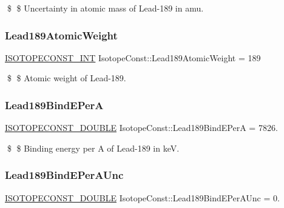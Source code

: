 \$ \$ Uncertainty in atomic mass of Lead-\/189 in amu. \mbox{\label{group___isotope_const-_lead-_pb189_gaf3a9e4e658891198340e231dde4169ab}} 
\subsubsection{\texorpdfstring{Lead189\+Atomic\+Weight}{Lead189AtomicWeight}}
{\footnotesize\ttfamily \mbox{\hyperlink{group___isotope_const-_macros_ga5f18360b3e99483a35c32d789e62621c}{I\+S\+O\+T\+O\+P\+E\+C\+O\+N\+S\+T\+\_\+\+I\+NT}} Isotope\+Const\+::\+Lead189\+Atomic\+Weight = 189}

\$ \$ Atomic weight of Lead-\/189. \mbox{\label{group___isotope_const-_lead-_pb189_ga5c1ba137847bd22cffa16084cc810b4a}} 
\subsubsection{\texorpdfstring{Lead189\+Bind\+E\+PerA}{Lead189BindEPerA}}
{\footnotesize\ttfamily \mbox{\hyperlink{group___isotope_const-_macros_ga8f45a7272ce02c0b4c65c44636ed719a}{I\+S\+O\+T\+O\+P\+E\+C\+O\+N\+S\+T\+\_\+\+D\+O\+U\+B\+LE}} Isotope\+Const\+::\+Lead189\+Bind\+E\+PerA = 7826.}

\$ \$ Binding energy per A of Lead-\/189 in keV. \mbox{\label{group___isotope_const-_lead-_pb189_ga603a35bd8abacf3064dd95849811b15b}} 
\subsubsection{\texorpdfstring{Lead189\+Bind\+E\+Per\+A\+Unc}{Lead189BindEPerAUnc}}
{\footnotesize\ttfamily \mbox{\hyperlink{group___isotope_const-_macros_ga8f45a7272ce02c0b4c65c44636ed719a}{I\+S\+O\+T\+O\+P\+E\+C\+O\+N\+S\+T\+\_\+\+D\+O\+U\+B\+LE}} Isotope\+Const\+::\+Lead189\+Bind\+E\+Per\+A\+Unc = 0.}


